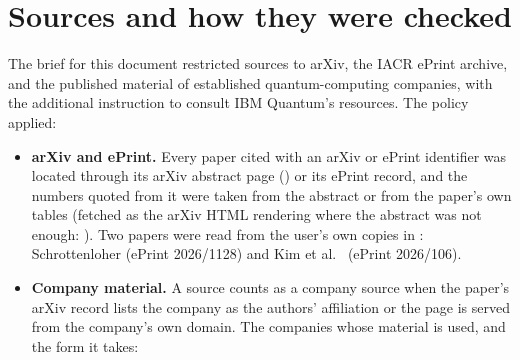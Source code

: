\section{Sources and how they were checked}\label{app:sources}

The brief for this document restricted sources to arXiv, the IACR ePrint archive, and the published material of established quantum-computing companies, with the additional instruction to consult IBM Quantum's resources. The policy applied:

\begin{itemize}[leftmargin=*]
\item \textbf{arXiv and ePrint.} Every paper cited with an arXiv or ePrint identifier was located through its arXiv abstract page () or its ePrint record, and the numbers quoted from it were taken from the abstract or from the paper's own tables (fetched as the arXiv HTML rendering where the abstract was not enough: \cite{babbush26,haener26,yoder25tour,cain26}). Two papers were read from the user's own copies in : Schrottenloher \cite{schrottenloher26} (ePrint 2026/1128) and Kim et al.\ \cite{kim26} (ePrint 2026/106).
\item \textbf{Company material.} A source counts as a company source when the paper's arXiv record lists the company as the authors' affiliation or the page is served from the company's own domain. The companies whose material is used, and the form it takes:
\end{itemize}
